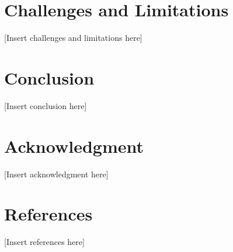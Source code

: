 \documentclass[conference]{IEEEtran}
\begin{document}
	\section{Challenges and Limitations}
	[Insert challenges and limitations here]
	
	\section{Conclusion}
	[Insert conclusion here]
	
	\section*{Acknowledgment}
	[Insert acknowledgment here]
	
	\section*{References}
	[Insert references here]
	
\end{document}
